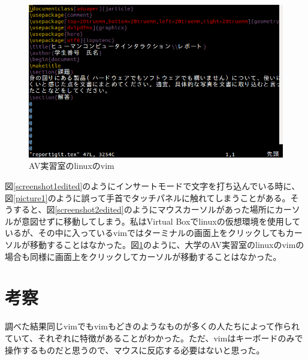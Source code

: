 \documentclass[a4paper]{jarticle}
\begin{document}
\begin{figure}[H]
	\begin{center}
		\includegraphics[width=15cm]{linuxscreenshot.png}
		\caption{AV実習室のlinuxのvim}
		\label{linuxscreenshot}
	\end{center}
\end{figure}
図\ref{screenshot1edited}のようにインサートモードで文字を打ち込んでいる時に、図\ref{picture1}のように誤って手首でタッチパネルに触れてしまうことがある。そうすると、図\ref{screenshot2edited}のようにマウスカーソルがあった場所にカーソルが意図せずに移動してしまう。私はVirtual Boxでlinuxの仮想環境を使用しているが、その中に入っているvimではターミナルの画面上をクリックしてもカーソルが移動することはなかった。図\ref{linuxscreenshot}のように、大学のAV実習室のlinuxのvimの場合も同様に画面上をクリックしてカーソルが移動することはなかった。
\section{考察}
調べた結果同じvimでもvimもどきのようなものが多くの人たちによって作られていて、それぞれに特徴があることがわかった。ただ、vimはキーボードのみで操作するものだと思うので、マウスに反応する必要はないと思った。
\end{document}
